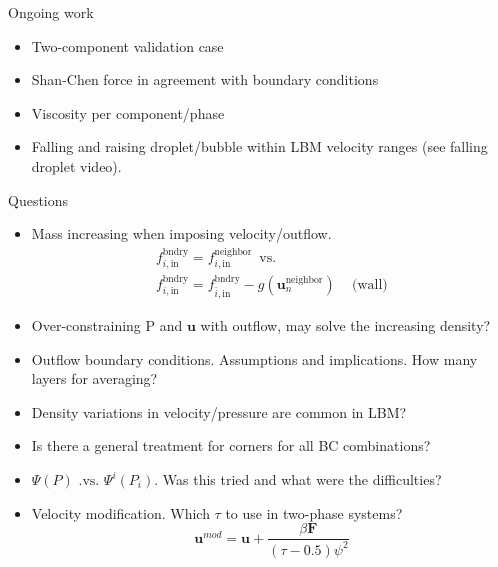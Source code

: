 \documentclass{beamer}
\begin{document}
	\begin{frame}{Ongoing work}
		\begin{itemize}
			\item Two-component validation case
			\item Shan-Chen force in agreement with boundary conditions
			\item Viscosity per component/phase
			\item Falling and raising droplet/bubble within LBM velocity ranges (see falling droplet video).
		\end{itemize}
	\end{frame}
	
	\begin{frame}{Questions}
		\begin{itemize}
			\item<1> Mass increasing when imposing velocity/outflow.
			\begin{equation*}
			\begin{split}
				f_{i,\text{in}}^{\text{bndry}} = f_{i,\text{in}}^{\text{neighbor}} \, \, \, \text{vs.}\\
				f_{i,\text{in}}^{\text{bndry}} = f_{\bar{i},\text{in}}^{\text{bndry}} - g(\mathbf{u}_{n}^{\text{neighbor}}) \,\,\,\,\, \text{    (wall)}
			\end{split}
			\end{equation*}
			\item<1> Over-constraining P and $\mathbf{u}$ with outflow, may solve the increasing density?
			\item<2> Outflow boundary conditions. Assumptions and implications. How many layers for averaging?
			\item<2> Density variations in velocity/pressure are common in LBM?
			\item<3> Is there a general treatment for corners for all BC combinations?
			\item<3> $\Psi(P) \text{ .vs. } \Psi^i(P_i)$. Was this tried and what were the difficulties?
			\item<3> Velocity modification. Which $\tau$ to use in two-phase systems?
			\begin{equation}
			\mathbf{u}^{mod} = \mathbf{u} + \frac{\beta \mathbf{F}}{(\tau - 0.5)\psi^2}
			\end{equation}
		\end{itemize}
	\end{frame}
\end{document}
